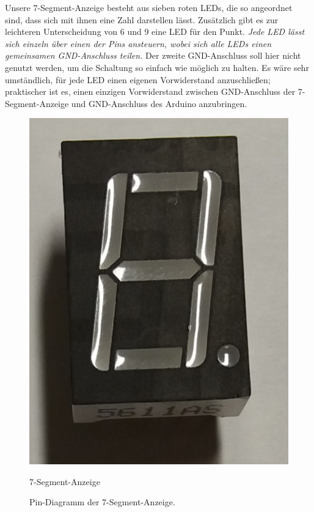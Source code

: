 \begin{minipage}{0.58\textwidth}
	Unsere 7-Segment-Anzeige besteht aus sieben roten LEDs, die so angeordnet sind, dass sich mit ihnen eine Zahl darstellen lässt. Zusätzlich gibt es  zur leichteren Unterscheidung von 6 und 9 eine LED für den Punkt. \emph{Jede LED lässt sich einzeln über einen der Pins ansteuern, wobei sich alle LEDs einen gemeinsamen GND-Anschluss teilen.} Der zweite GND-Anschluss soll hier nicht genutzt werden, um die Schaltung so einfach wie möglich zu halten. Es wäre sehr umständlich, für jede LED einen eigenen Vorwiderstand anzuschließen; praktischer ist es, einen einzigen Vorwiderstand zwischen GND-Anschluss der 7-Segment-Anzeige und GND-Anschluss des Arduino anzubringen.
\end{minipage}
\hfill
\begin{minipage}{0.4\textwidth}
	\begin{figure}[H]
		\hfill
		\begin{minipage}{0.48\textwidth}
			\includegraphics[width=\textwidth]{pics/7segmentanzeige-bild2.jpg}
			\caption{7-Segment-Anzeige}
			\label{abb:7segment-bild}
		\end{minipage}
		\hfill
		\begin{minipage}{0.48\textwidth}
			
			\caption{Pin-Diagramm der 7-Segment-Anzeige.}
			\label{abb:7segment-pins}
		\end{minipage}
		\hfill
	\end{figure}
\end{minipage}

